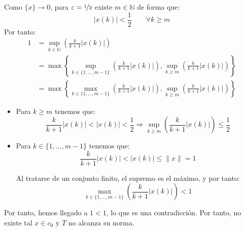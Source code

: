 \documentclass[12pt]{article}
\begin{document}
\begin{ejercicio}[7 puntos]
\begin{enumerate}[label=\alph*)]
\begin{description}
                    Como $\{x\}\to 0$, para $\varepsilon = \nicefrac{1}{2}$ existe $m\in \mathbb{N}$ de forma que:
                    \begin{equation*}
                        |x(k)| < \frac{1}{2} \qquad \forall k\geq m
                    \end{equation*}
                    Por tanto:
                    \begin{align*}
                        1 &= \sup_{k \in \mathbb{N}}\left(\frac{k}{k+1}|x(k)|\right) \\
                        &= \max\left\{\sup_{k \in \{1,\ldots,m-1\}}\left(\frac{k}{k+1}|x(k)|\right), \sup_{k\geq m}\left(\frac{k}{k+1}|x(k)|\right)\right\} \\
                        &= \max\left\{\max_{k \in \{1,\ldots,m-1\}}\left(\frac{k}{k+1}|x(k)|\right), \sup_{k\geq m}\left(\frac{k}{k+1}|x(k)|\right)\right\}
                    \end{align*}
                    \begin{itemize}
                        \item Para $k\geq m$ tenemos que:
                        \begin{equation*}
                            \dfrac{k}{k+1}|x(k)| < |x(k)| < \frac{1}{2}
                            \Longrightarrow \sup_{k\geq m}\left(\frac{k}{k+1}|x(k)|\right) \leq \frac{1}{2}
                        \end{equation*}
                        \item Para $k\in \{1,\ldots,m-1\}$ tenemos que:
                        \begin{equation*}
                            \frac{k}{k+1}|x(k)| < |x(k)| \leq \|x\| = 1
                        \end{equation*}

                        Al tratarse de un conjunto finito, el supremo es el máximo, y por tanto:
                        \begin{equation*}
                            \max_{k \in \{1,\ldots,m-1\}}\left(\frac{k}{k+1}|x(k)|\right) < 1
                        \end{equation*}
                    \end{itemize}

                    Por tanto, hemos llegado a $1<1$, lo que es una contradicción. Por tanto, no existe tal $x\in c_0$ y $T$ no alcanza su norma.
                \end{description}
        \end{enumerate}
    \end{ejercicio}
\end{document}
